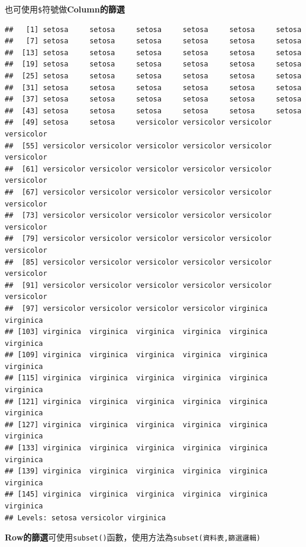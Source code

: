 \documentclass[]{book}
\newenvironment{Shaded}{\begin{snugshade}}{\end{snugshade}}
\newcommand{\NormalTok}[1]{{#1}}
\theoremstyle{definition}
\theoremstyle{definition}
\theoremstyle{remark}
\begin{document}
也可使用\texttt{\$}符號做\textbf{Column的篩選}

\begin{Shaded}
\end{Shaded}

\begin{verbatim}
##   [1] setosa     setosa     setosa     setosa     setosa     setosa    
##   [7] setosa     setosa     setosa     setosa     setosa     setosa    
##  [13] setosa     setosa     setosa     setosa     setosa     setosa    
##  [19] setosa     setosa     setosa     setosa     setosa     setosa    
##  [25] setosa     setosa     setosa     setosa     setosa     setosa    
##  [31] setosa     setosa     setosa     setosa     setosa     setosa    
##  [37] setosa     setosa     setosa     setosa     setosa     setosa    
##  [43] setosa     setosa     setosa     setosa     setosa     setosa    
##  [49] setosa     setosa     versicolor versicolor versicolor versicolor
##  [55] versicolor versicolor versicolor versicolor versicolor versicolor
##  [61] versicolor versicolor versicolor versicolor versicolor versicolor
##  [67] versicolor versicolor versicolor versicolor versicolor versicolor
##  [73] versicolor versicolor versicolor versicolor versicolor versicolor
##  [79] versicolor versicolor versicolor versicolor versicolor versicolor
##  [85] versicolor versicolor versicolor versicolor versicolor versicolor
##  [91] versicolor versicolor versicolor versicolor versicolor versicolor
##  [97] versicolor versicolor versicolor versicolor virginica  virginica 
## [103] virginica  virginica  virginica  virginica  virginica  virginica 
## [109] virginica  virginica  virginica  virginica  virginica  virginica 
## [115] virginica  virginica  virginica  virginica  virginica  virginica 
## [121] virginica  virginica  virginica  virginica  virginica  virginica 
## [127] virginica  virginica  virginica  virginica  virginica  virginica 
## [133] virginica  virginica  virginica  virginica  virginica  virginica 
## [139] virginica  virginica  virginica  virginica  virginica  virginica 
## [145] virginica  virginica  virginica  virginica  virginica  virginica 
## Levels: setosa versicolor virginica
\end{verbatim}

\textbf{Row的篩選}可使用\texttt{subset()}函數，使用方法為\texttt{subset(資料表,篩選邏輯)}
\end{document}
